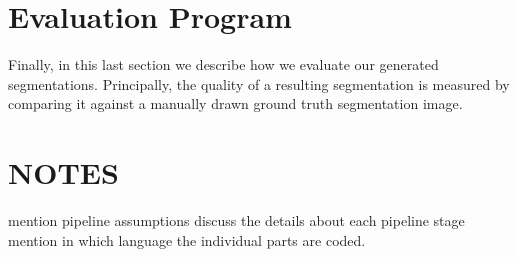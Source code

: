 \section{Evaluation Program}
Finally, in this last section we describe how we evaluate our generated segmentations. Principally, the quality of a resulting segmentation is measured by comparing it against a manually drawn ground truth segmentation image.

\section{NOTES}
mention pipeline assumptions
discuss the details about each pipeline stage
mention in which language the individual parts are coded.
